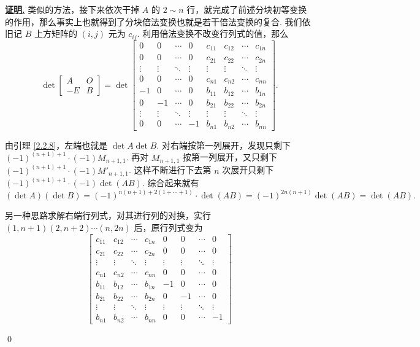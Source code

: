 \documentclass[10pt,openany]{article}
\theoremstyle{thmstyle} %
\theoremstyle{defstyle} %
\theoremstyle{prostyle} %
\theoremstyle{exastyle}
\theoremstyle{remstyle}
\renewenvironment{proof}[1][证明]{\par\underline{\textbf{#1.}} \;\fangsong}{\qed\par}
\begin{document}
\begin{proof}
	类似的方法，接下来依次干掉 \( A \) 的 \( 2\sim n \) 行，就完成了前述分块初等变换的作用，那么事实上也就得到了分块倍法变换也就是若干倍法变换的复合. 我们依旧记 \( B \) 上方矩阵的 \( (i,j) \) 元为 \( c_{ij} \). 利用倍法变换不改变行列式的值，那么
	\[ \det \begin{bmatrix}
		A & O \\
		-E & B
	\end{bmatrix}= \det \begin{bmatrix}
	 0 & 0 & \cdots & 0 & c_{11} & c_{12} & \cdots & c_{1n} \\
	 0 & 0 & \cdots & 0 & c_{21} & c_{22} & \cdots & c_{2n} \\
	\vdots & \vdots & \ddots & \vdots & \vdots & \vdots & \ddots & \vdots \\
	  0 & 0 & \cdots & 0 & c_{n1} & c_{n2} & \cdots & c_{nn} \\
	-1 & 0 & \cdots & 0  & b_{11} & b_{12} & \cdots & b_{1n} \\
	0 & -1 & \cdots & 0  & b_{21} & b_{22} & \cdots & b_{2n} \\
	\vdots & \vdots & \ddots & \vdots & \vdots & \vdots & \ddots & \vdots \\
	0 & 0 & \cdots & -1 & b_{n1} & b_{n2} & \cdots & b_{nn} 
	\end{bmatrix}. \]
	
	由引理 \ref{2.2.8}，左端也就是 \( \det A \det B \). 对右端按第一列展开，发现只剩下 \( (-1)^{(n+1)+1} \cdot (-1) M_{n+1,1} \). 再对 \( M_{n+1,1} \) 按第一列展开，又只剩下 \( (-1)^{(n+1)+1} \cdot (-1) M'_{n+1,1} \). 这样不断进行下去第 \( n \) 次展开只剩下 \( (-1)^{(n+1)+1} \cdot (-1) \det (AB) \). 综合起来就有
	\[ (\det A)(\det B)=(-1)^{n(n+1)+2(1+\cdots+1)} \cdot \det (AB)= (-1)^{2n(n+1)} \det (AB)= \det(AB). \]
	
	另一种思路求解右端行列式，对其进行列的对换，实行 \( (1,n+1)(2,n+2)\cdots(n,2n) \) 后，原行列式变为
	\[ \begin{bmatrix}
		c_{11} & c_{12} & \cdots & c_{1n} & 0 & 0 & \cdots & 0 \\
		c_{21} & c_{22} & \cdots & c_{2n} & 0 & 0 & \cdots & 0 \\
		\vdots & \vdots & \ddots & \vdots & \vdots & \vdots & \ddots & \vdots \\
		c_{n1} & c_{n2} & \cdots & c_{nn} & 0 & 0 & \cdots & 0 \\
		b_{11} & b_{12} & \cdots & b_{1n} & -1 & 0 & \cdots & 0 \\
		b_{21} & b_{22} & \cdots & b_{2n} & 0 & -1 & \cdots & 0 \\
		\vdots & \vdots & \ddots & \vdots & \vdots & \vdots & \ddots & \vdots \\
		b_{n1} & b_{n2} & \cdots & b_{nn} & 0 & 0 & \cdots & -1
	\end{bmatrix} \]
	

\end{proof}
\end{document}

